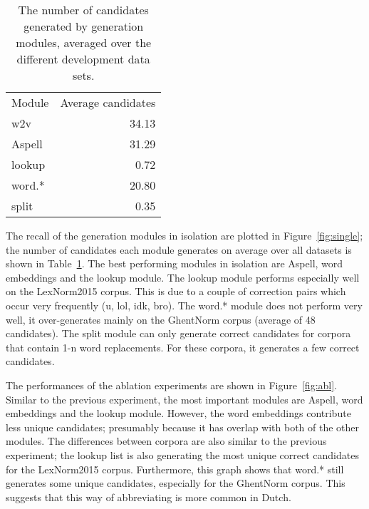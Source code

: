 \documentclass[a4paper,10pt,twoside]{article}
\begin{document}
\begin{table}
    \centering
    \begin{tabular}{l r}
        Module  & Average candidates \\
        w2v     & 34.13     \\
        Aspell  & 31.29    \\
        lookup  & 0.72      \\
        word.*  & 20.80     \\
        split   & 0.35      \\
    \end{tabular}
    \caption{The number of candidates generated by generation modules, averaged over the different development data sets.} 
    \label{tab:resGen}
\end{table}

The recall of the generation modules in isolation are plotted in
Figure~\ref{fig:single}; the number of candidates each module generates on
average over all datasets is shown in Table~\ref{tab:resGen}. The best performing
modules in isolation are Aspell, word embeddings and the lookup module. The
lookup module performs especially well on the LexNorm2015 corpus. This is due
to a couple of correction pairs which occur very frequently (u, lol, idk, bro).
The word.* module does not perform very well, it over-generates mainly on the
GhentNorm corpus (average of 48 candidates). The split module can only generate 
correct candidates for corpora that contain 1-n word replacements.  For these
corpora, it generates a few correct candidates.


The performances of the ablation experiments are shown in Figure~\ref{fig:abl}.
Similar to the previous experiment, the most important modules are Aspell, word
embeddings and the lookup module. However, the word embeddings
contribute less unique candidates; presumably because it has overlap with both
of the other modules.  The differences between corpora are also similar to the
previous experiment; the lookup list is also generating the most unique correct
candidates for the LexNorm2015 corpus. Furthermore, this graph shows
that word.* still generates some unique candidates, especially for the GhentNorm
corpus. This suggests that this way of abbreviating is more common in Dutch.
\end{document}
